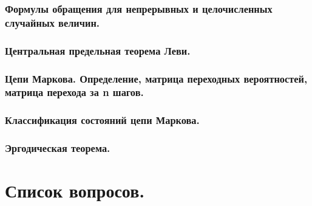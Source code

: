 \documentclass[14pt]{extarticle}
\theoremstyle{breakstyle}
\begin{document}
\subsubsection{Формулы обращения для непрерывных и целочисленных случайных величин.}

\subsubsection{Центральная предельная теорема Леви.}

\subsubsection{Цепи Маркова. Определение, матрица переходных вероятностей, матрица перехода за n шагов.}

\subsubsection{Классификация состояний цепи Маркова.}

\subsubsection{Эргодическая теорема.}




\clearpage
\section{Список вопросов.}
\end{document}
